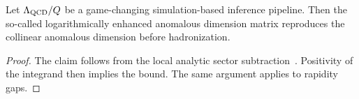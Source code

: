 \begin{corollary}\label{thm:2}
Let $\Lambda_{\rm QCD}/Q$ be a game-changing simulation-based inference
pipeline. Then the so-called logarithmically enhanced anomalous
dimension matrix reproduces the collinear anomalous dimension before
hadronization.
\end{corollary}

\begin{proof}
The claim follows from the local analytic sector
subtraction~\cite{TPC:0903-On-the-Factorization-of-Fine-Tuned-Zero-Bin-Subtractions-in-Heavy-Ion-Collisions-September-19-2026}.
Positivity of the integrand then implies the bound. The same argument
applies to rapidity gaps.
\end{proof}


